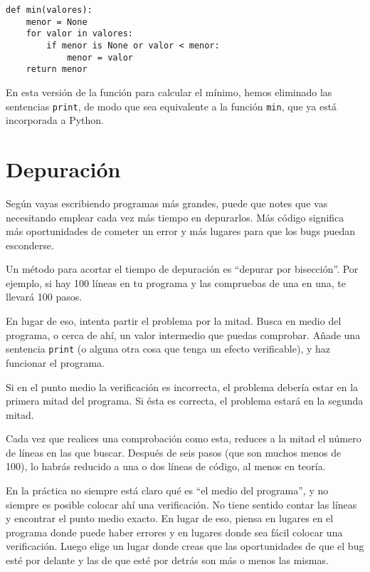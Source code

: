\beforeverb
\begin{verbatim}
def min(valores):
    menor = None
    for valor in valores:
        if menor is None or valor < menor:
            menor = valor
    return menor
\end{verbatim}
\afterverb
%
En esta versión de la función para calcular el mínimo, hemos eliminado las
sentencias {\tt print}, de modo que sea equivalente a la función {\tt min},
que ya está incorporada a Python.

\section{Depuración}

Según vayas escribiendo programas más grandes, puede que notes que vas necesitando
emplear cada vez más tiempo en depurarlos. Más código significa más oportunidades de
cometer un error y más lugares para que los bugs puedan esconderse.


Un método para acortar el tiempo de depuración es ``depurar por bisección''.
Por ejemplo, si hay 100 líneas en tu programa y las compruebas
de una en una, te llevará 100 pasos.

En lugar de eso, intenta partir el problema por la mitad. Busca en medio
del programa, o cerca de ahí, un valor intermedio que puedas
comprobar. Añade una sentencia {\tt print} (o alguna otra cosa
que tenga un efecto verificable), y haz funcionar el programa.

Si en el punto medio la verificación es incorrecta, el problema debería
estar en la primera mitad del programa. Si ésta es correcta, el problema
estará en la segunda mitad.

Cada vez que realices una comprobación como esta, reduces a la mitad el número
de líneas en las que buscar. Después de seis pasos (que son muchos
menos de 100), lo habrás reducido a una o dos líneas de código,
al menos en teoría.

En la práctica no siempre está claro qué es
``el medio del programa'', y no siempre es posible colocar ahí
una verificación. No tiene sentido contar las líneas y encontrar
el punto medio exacto. En lugar de eso, piensa en lugares en el programa
donde puede haber errores y en lugares donde sea fácil colocar una verificación.
Luego elige un lugar donde creas que las oportunidades de que el bug
esté por delante y las de que esté por detrás son más o menos las mismas.

